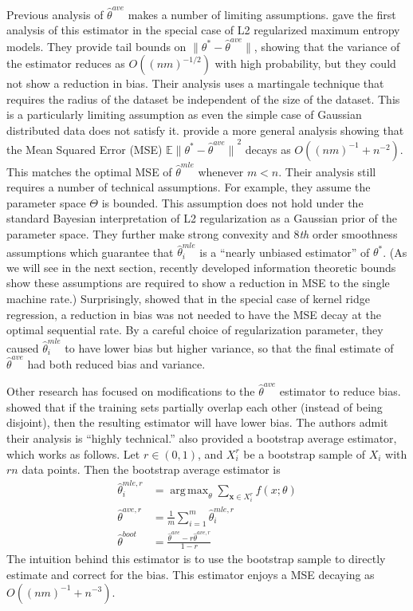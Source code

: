 \documentclass[twoside]{article}
\DeclareMathOperator*{\argmax}{arg\,max}
\newcommand{\E}{\mathbb{E}}
\newcommand{\x}{\mathbf{x}}
\newcommand{\w}{\theta}
\newcommand{\wave}{\hat\w^{ave}}
\newcommand{\waver}{\hat\w^{ave,r}}
\newcommand{\wboot}{\hat\w^{boot}}
\newcommand{\wmle}{\hat\w^{mle}}
\newcommand{\wmler}{\hat\w^{mle,r}}
\newcommand{\wstar}{{\w^{*}}}
\newcommand{\ltwo}[1]{{\lVert {#1} \rVert}}
\begin{document}
Previous analysis of $\wave$ makes a number of limiting assumptions.
\cite{mcdonald2009efficient} gave the first analysis of this estimator in the special case of L2 regularized maximum entropy models.
They provide tail bounds on $\ltwo{\wstar-\wave}$, showing that the variance of the estimator reduces as $O((nm)^{-1/2})$ with high probability,
but they could not show a reduction in bias.
Their analysis uses a martingale technique that requires the radius of the dataset be independent of the size of the dataset.
This is a particularly limiting assumption as even the simple case of Gaussian distributed data does not satisfy it.
\cite{zhang2012communication} provide a more general analysis showing that the Mean Squared Error (MSE) $\E\ltwo{\wstar-\wave}^2$ decays as $O((nm)^{-1} + n^{-2})$.
This matches the optimal MSE of $\wmle$ whenever $m<n$.
Their analysis still requires a number of technical assumptions.
For example, they assume the parameter space $\Theta$ is bounded.
This assumption does not hold under the standard Bayesian interpretation of L2 regularization as a Gaussian prior of the parameter space.
They further make strong convexity and 8\emph{th} order smoothness assumptions which guarantee that $\wmle_i$ is a ``nearly unbiased estimator'' of $\wstar$.
(As we will see in the next section,
recently developed information theoretic bounds show these assumptions are required to show a reduction in MSE to the single machine rate.)
Surprisingly, \cite{zhang2013divide} showed that in the special case of kernel ridge regression, a reduction in bias was not needed to have the MSE decay at the optimal sequential rate.
By a careful choice of regularization parameter, they caused $\wmle_i$ to have lower bias but higher variance, so that the final estimate of $\wave$ had both reduced bias and variance.

Other research has focused on modifications to the $\wave$ estimator to reduce bias.
\cite{zinkevich2010parallelized} showed that if the training sets partially overlap each other (instead of being disjoint), then the resulting estimator will have lower bias.
The authors admit their analysis is ``highly technical.''
\cite{zhang2012communication} also provided a bootstrap average estimator,
which works as follows.
Let $r\in(0,1)$, and $X_i^r$ be a bootstrap sample of $X_i$ with $rn$ data points.
Then the bootstrap average estimator is
\begin{equation}
\begin{aligned}
\wmler_i &= \argmax_\w \sum_{\x\in X_i^r} f(x;\w)
\\
\waver &= \frac{1}{m}\sum_{i=1}^m \wmler_i
\\
\wboot & = \frac{\wave-r\waver}{1-r}
\end{aligned}
\end{equation}
The intuition behind this estimator is to use the bootstrap sample to directly estimate and correct for the bias.
This estimator enjoys a MSE decaying as $O((nm)^{-1}+n^{-3})$.
\end{document}

